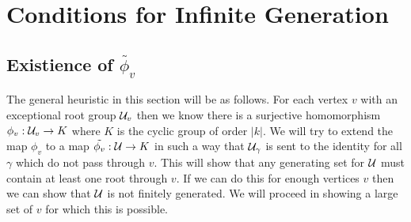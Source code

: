 \documentclass[class=book, crop=false,12 pt]{standalone}
\begin{document}
\chapter{Conditions for Infinite Generation}
\section{Existience of $\tilde{\phi_v}$}
The general heuristic in this section will be as follows. For each vertex $v$ with an exceptional root group $\mathcal{U}_v$ then we know there is a surjective homomorphism $\phi_v:\mathcal{U}_v \to K$ where $K$ is the cyclic group of order $|k|.$ We will try to extend the map $\phi_v$ to a map $\tilde{\phi_v}:\mathcal{U}\to K$ in such a way that $\mathcal{U}_\gamma$ is sent to the identity for all $\gamma$ which do not pass through $v.$ This will show that any generating set for $\mathcal{U}$ must contain at least one root through $v.$ If we can do this for enough vertices $v$ then we can show that $\mathcal{U}$ is not finitely generated. We will proceed in showing a large set of $v$ for which this is possible.
\end{document}
